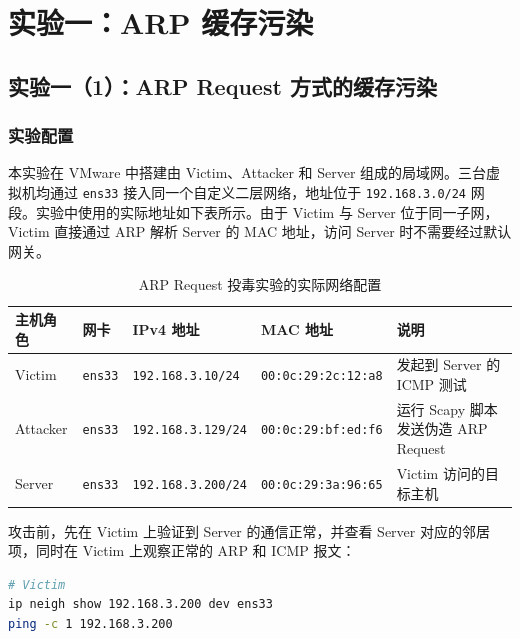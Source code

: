 \section{实验一：ARP 缓存污染}

\subsection{实验一（1）：ARP Request 方式的缓存污染}

\subsubsection{实验配置}

本实验在 VMware 中搭建由 Victim、Attacker 和 Server 组成的局域网。三台虚拟机均通过 \texttt{ens33} 接入同一个自定义二层网络，地址位于 \texttt{192.168.3.0/24} 网段。实验中使用的实际地址如下表所示。由于 Victim 与 Server 位于同一子网，Victim 直接通过 ARP 解析 Server 的 MAC 地址，访问 Server 时不需要经过默认网关。

\begin{table}[H]
    \centering
    \caption{ARP Request 投毒实验的实际网络配置}
    \label{tab:task1-network}
    \renewcommand{\arraystretch}{1.25}
    \begin{tabularx}{\linewidth}{l l l l X}
        \toprule
        主机角色 & 网卡 & IPv4 地址 & MAC 地址 & 说明 \\
        \midrule
        Victim & \texttt{ens33} & \texttt{192.168.3.10/24} & \texttt{00:0c:29:2c:12:a8} & 发起到 Server 的 ICMP 测试 \\
        Attacker & \texttt{ens33} & \texttt{192.168.3.129/24} & \texttt{00:0c:29:bf:ed:f6} & 运行 Scapy 脚本发送伪造 ARP Request \\
        Server & \texttt{ens33} & \texttt{192.168.3.200/24} & \texttt{00:0c:29:3a:96:65} & Victim 访问的目标主机 \\
        \bottomrule
    \end{tabularx}
\end{table}

攻击前，先在 Victim 上验证到 Server 的通信正常，并查看 Server 对应的邻居项，同时在 Victim 上观察正常的 ARP 和 ICMP 报文：

\begin{lstlisting}[language=bash,caption={攻击前 Victim 的通信检查命令}]
# Victim
ip neigh show 192.168.3.200 dev ens33
ping -c 1 192.168.3.200

\end{lstlisting}


